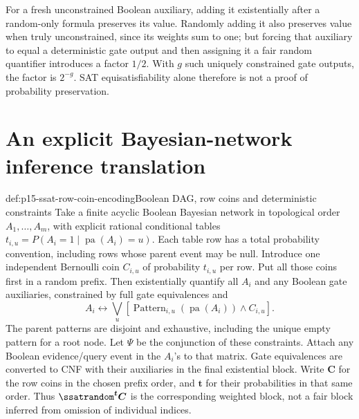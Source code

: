 For a fresh unconstrained Boolean auxiliary, adding it existentially
after a random-only formula preserves its value. Randomly adding it
also preserves value when truly unconstrained, since its weights sum to
one; but forcing that auxiliary to equal a deterministic gate output
and then assigning it a fair random quantifier introduces a factor
\(1/2\). With \(g\) such uniquely constrained gate outputs, the
factor is \(2^{-g}\). SAT equisatisfiability alone therefore is not a
proof of probability preservation.

\section{An explicit Bayesian-network inference translation}
\label{sec:p15-ssat-bayesian-inference}

\begin{hbdefinition}{def:p15-ssat-row-coin-encoding}{Boolean DAG, row coins and deterministic constraints}
Take a finite acyclic Boolean Bayesian network in topological order
\(A_1,\ldots,A_m\), with explicit rational conditional tables
\(t_{i,u}=P(A_i=1\mid\operatorname{pa}(A_i)=u)\).
Each table row has a total probability convention, including rows whose
parent event may be null. Introduce one independent Bernoulli coin
\(C_{i,u}\) of probability \(t_{i,u}\) per row. Put all those
coins first in a random prefix. Then existentially quantify all \(A_i\)
and any Boolean gate auxiliaries, constrained by full gate equivalences
and
\[
 A_i\leftrightarrow
       \bigvee_u[\operatorname{Pattern}_{i,u}(\operatorname{pa}(A_i))
                         \land C_{i,u}].
\]
The parent patterns are disjoint and exhaustive, including the unique
empty pattern for a root node. Let \(\Psi\) be the conjunction of
these constraints. Attach any Boolean evidence/query event in the
\(A_i\)'s to that matrix. Gate equivalences are converted to CNF
with their auxiliaries in the final existential block.
Write \(\boldsymbol C\) for the row coins in the chosen prefix order,
and \(\boldsymbol t\) for their probabilities in that same order.
Thus \(\ssatrandom^{\boldsymbol t}\boldsymbol C\) is the corresponding
weighted block, not a fair block inferred from omission of individual indices.
\end{hbdefinition}

